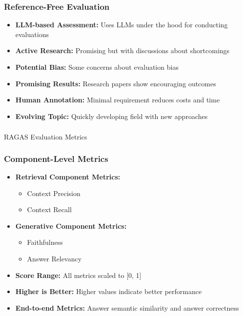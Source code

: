 \begin{frame}[fragile]\frametitle{Reference-Free Evaluation}
  \begin{itemize}
    \item \textbf{LLM-based Assessment:} Uses LLMs under the hood for conducting evaluations
    \item \textbf{Active Research:} Promising but with discussions about shortcomings
    \item \textbf{Potential Bias:} Some concerns about evaluation bias
    \item \textbf{Promising Results:} Research papers show encouraging outcomes
    \item \textbf{Human Annotation:} Minimal requirement reduces costs and time
    \item \textbf{Evolving Topic:} Quickly developing field with new approaches
  \end{itemize}
\end{frame}

\begin{frame}[fragile]\frametitle{}
\begin{center}
{\Large RAGAS Evaluation Metrics}
\end{center}
\end{frame}



\begin{frame}[fragile]\frametitle{Component-Level Metrics}
  \begin{itemize}
    \item \textbf{Retrieval Component Metrics:}
      \begin{itemize}
        \item Context Precision
        \item Context Recall
      \end{itemize}
    \item \textbf{Generative Component Metrics:}
      \begin{itemize}
        \item Faithfulness
        \item Answer Relevancy
      \end{itemize}
    \item \textbf{Score Range:} All metrics scaled to [0, 1]
    \item \textbf{Higher is Better:} Higher values indicate better performance
    \item \textbf{End-to-end Metrics:} Answer semantic similarity and answer correctness
  \end{itemize}
\end{frame}

